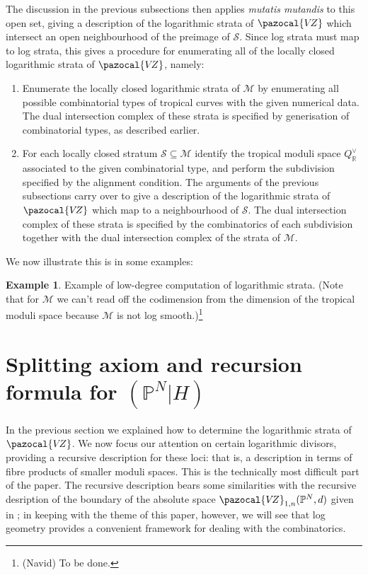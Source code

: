 \documentclass[11pt]{amsart}
\newcommand{\PP}{\mathbb P}
\newcommand{\VZ}{\pazocal{V\!Z}}
\newcommand{\Scal}{\mathcal{S}}
\newcommand{\Mcal}{\mathcal{M}}
\newcommand{\RR}{\mathbb{R}}
\theoremstyle{definition}
\theoremstyle{definition}
\newtheorem{example}[thm]{Example}
\begin{document}
The discussion in the previous subsections then applies \emph{mutatis mutandis} to this open set, giving a description of the logarithmic strata of $\VZ$ which intersect an open neighbourhood of the preimage of $\Scal$. Since log strata must map to log strata, this gives a procedure for enumerating all of the locally closed logarithmic strata of $\VZ$, namely:\medskip
\begin{enumerate}
\item Enumerate the locally closed logarithmic strata of $\Mcal$ by enumerating all possible combinatorial types of tropical curves with the given numerical data. The dual intersection complex of these strata is specified by generisation of combinatorial types, as described earlier.\medskip
\item For each locally closed stratum $\Scal\subseteq \Mcal$ identify the tropical moduli space $Q^\vee_{\RR}$ associated to the given combinatorial type, and perform the subdivision specified by the alignment condition. The arguments of the previous subsections carry over to give a description of the logarithmic strata of $\VZ$ which map to a neighbourhood of $\Scal$. The dual intersection complex of these strata is specified by the combinatorics of each subdivision together with the dual intersection complex of the strata of $\Mcal$.
\end{enumerate}
We now illustrate this is in some examples:
\begin{example} Example of low-degree computation of logarithmic strata. (Note that for $\Mcal$ we can't read off the codimension from the dimension of the tropical moduli space because $\Mcal$ is not log smooth.)\footnote{(Navid) To be done.}\end{example}


\newpage

\section{Splitting axiom and recursion formula for $(\PP^N|H)$}

\noindent  In the previous section we explained how to determine the logarithmic strata of $\VZ$. We now focus our attention on certain logarithmic divisors, providing a recursive description for these loci: that is, a description in terms of fibre products of smaller moduli spaces. This is the technically most difficult part of the paper. The recursive description bears some similarities with the recursive desription of the boundary of the absolute space $\VZ_{1,n}(\PP^N,d)$ given in \cite{VZ}; in keeping with the theme of this paper, however, we will see that log geometry provides a convenient framework for dealing with the combinatorics.
\end{document}
